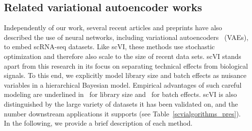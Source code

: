 \begin{table}
{
    }
    \caption[Presentation of the different datasets, their gene filtering and applicability of algorithms]{Presentation of the different datasets, their gene filtering and applicability of algorithms. ``\_'' indicates combinations of algorithms and datasets that were included in this study. ``x'' indicates that the algorithm took more than four hours to run (ZIFA) or that the computer ran out of memory (others). ``NA'' indicates datasets where pre-annotated subpopulations were not available, which makes them less useful for application with SIMLR and benchmarks of clustering. ``NC'' indicates the remaining combinations of algorithms and datasets that were not considered for this study. For instance, BRAIN-SMALL was only used to study the correlation of scVI zero probabilities and quality parameters (Figure 6).}
    \label{scvidatasets}
    \end{table}
    

    


\subsection{Related variational autoencoder works}
Independently of our work, several recent articles and preprints have also described the use of neural networks, including variational autoencoders~\cite{kingma2013} (VAEs), to embed scRNA-seq datasets. Like scVI, these methods use stochastic optimization and therefore also scale to the size of recent data sets. 
scVI stands apart from this research in its focus on separating technical effects from biological signals. To this end, we explicitly model library size and batch effects as nuisance variables in a hierarchical Bayesian model. Empirical advantages of such careful modeling are underlined in~\cite{biscuit,basics} for library size and~\cite{zinbwave,SCONE} for batch effects. scVI is also distinguished by the large variety of datasets it has been validated on, and the number downstream applications it supports (see Table~\ref{scvialgorithms_pres}). In the following, we provide a brief description of each method.

